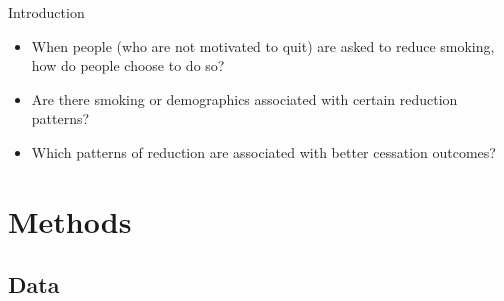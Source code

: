 \documentclass[aspectratio=169]{beamer}
\begin{document}
%
\begin{frame}{Introduction}
	\begin{block}{}
		\begin{itemize}
			 \raggedright
			\item When people (who are not motivated to quit) are asked to reduce smoking, how do people choose to do so? 
			\pause
			\item Are there smoking or demographics associated with certain reduction patterns?
			\pause
			\item Which patterns of reduction are associated with better cessation outcomes?
		\end{itemize}
	\end{block}
	
	

\end{frame}

\section{Methods}
\subsection{Data}
\end{document}
